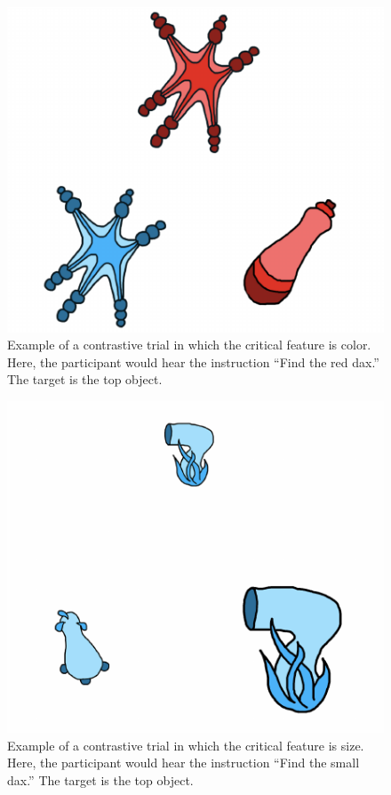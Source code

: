 \documentclass[10pt, letterpaper]{article}
\newenvironment{CodeChunk}{}{}
\begin{document}
\begin{CodeChunk}
\begin{figure}[H]

{\centering \includegraphics{figs/colortrial-1} 

}

\caption[Example of a contrastive trial in which the critical feature is color]{Example of a contrastive trial in which the critical feature is color. Here, the participant would hear the instruction ``Find the red dax.'' The target is the top object.}\label{fig:colortrial}
\end{figure}
\end{CodeChunk}
\begin{CodeChunk}
\begin{figure}[H]

{\centering \includegraphics{figs/sizetrial-1} 

}

\caption[Example of a contrastive trial in which the critical feature is size]{Example of a contrastive trial in which the critical feature is size. Here, the participant would hear the instruction ``Find the small dax.'' The target is the top object.}\label{fig:sizetrial}
\end{figure}
\end{CodeChunk}
\end{document}
